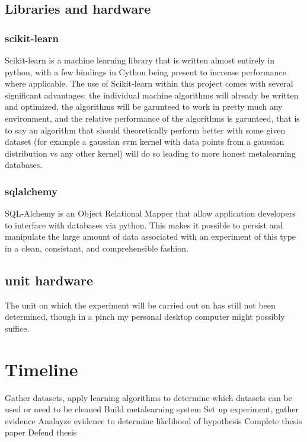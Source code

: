 \documentclass[a4paper,11pt]{article}
\begin{document}
\subsection{Libraries and hardware}
\subsubsection{scikit-learn}
Scikit-learn is a machine learning library that is written almost entirely in python, with a few
bindings in Cython being present to increase performance where applicable. The use of Scikit-learn
within this project comes with several significant advantages: the individual machine algorithms
will already be written and optimized, the algorithms will be garunteed to work in pretty much any
environment, and the relative performance of the algorithms is garunteed, that is to say an algorithm
that should theoretically perform better with some given dataset (for example a gaussian svm kernel
with data points from a gaussian distribution vs any other kernel) will do so leading to more honest
metalearning databases.

\subsubsection{sqlalchemy}
SQL-Alchemy is an Object Relational Mapper that allow application developers to interface with
databases via python. This makes it possible to persist and manipulate the large amount of data
associated with an experiment of this type in a clean, consistant, and comprehensible fashion.

\subsection{unit hardware}
The unit on which the experiment will be carried out on has still not been determined, though in
a pinch my personal desktop computer might possibly suffice.
\section{Timeline}
  Gather datasets, apply learning algorithms to determine which datasets can be used or need to be cleaned
  Build metalearning system
  Set up experiment, gather evidence
  Analayze evidence to determine likelihood of hypothesis
  Complete thesis paper
  Defend thesis
\end{document}
